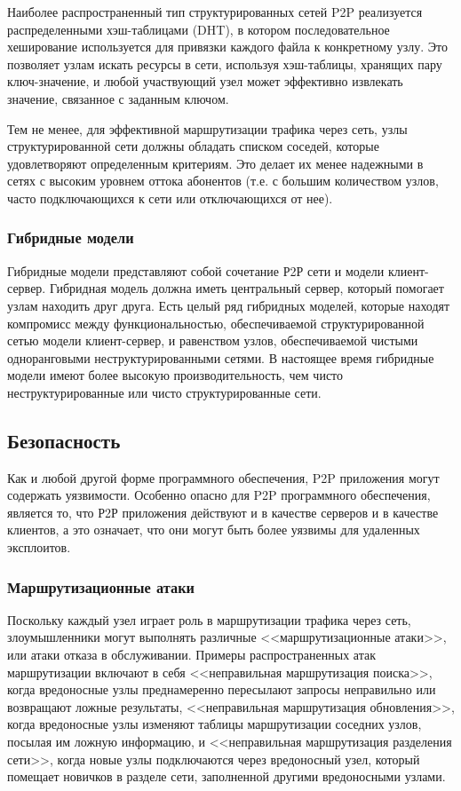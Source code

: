 \documentclass[bachelor, och, coursework]{SCWorks}
\begin{document}
Наиболее распространенный тип структурированных сетей P2P реализуется распределенными хэш-таблицами (DHT), 
в котором последовательное хеширование используется для привязки каждого файла к конкретному узлу. Это позволяет узлам искать ресурсы в сети, используя хэш-таблицы, хранящих пару ключ-значение, и любой участвующий узел может эффективно извлекать значение, связанное с заданным ключом.

Тем не менее, для эффективной маршрутизации трафика через сеть, узлы структурированной сети должны обладать списком соседей, 
которые удовлетворяют определенным критериям. 
Это делает их менее надежными в сетях с высоким уровнем оттока абонентов (т.е. с большим количеством узлов, 
часто подключающихся к сети или отключающихся от нее).

\subsubsection{Гибридные модели}
Гибридные модели представляют собой сочетание Р2Р сети и модели клиент-сервер. 
Гибридная модель должна иметь центральный сервер, который помогает узлам находить друг друга. 
Есть целый ряд гибридных моделей, которые находят компромисс между функциональностью, обеспечиваемой структурированной сетью модели клиент-сервер, 
и равенством узлов, обеспечиваемой чистыми одноранговыми неструктурированными сетями. 
В настоящее время гибридные модели имеют более высокую производительность, чем чисто неструктурированные или чисто структурированные сети.

\subsection{Безопасность}
Как и любой другой форме программного обеспечения, P2P приложения могут содержать уязвимости. 
Особенно опасно для P2P программного обеспечения, является то, что Р2Р приложения действуют и в качестве серверов и в качестве клиентов, 
а это означает, что они могут быть более уязвимы для удаленных эксплоитов.

\subsubsection{Маршрутизационные атаки}
Поскольку каждый узел играет роль в маршрутизации трафика через сеть, злоумышленники могут выполнять различные <<маршрутизационные атаки>>, или атаки отказа в обслуживании. Примеры распространенных атак маршрутизации включают в себя <<неправильная маршрутизация поиска>>, когда вредоносные узлы преднамеренно пересылают запросы неправильно или возвращают ложные результаты, <<неправильная маршрутизация обновления>>, когда вредоносные узлы изменяют таблицы маршрутизации соседних узлов, посылая им ложную информацию, и <<неправильная маршрутизация разделения сети>>, когда новые узлы подключаются через вредоносный узел, который помещает новичков в разделе сети, заполненной другими вредоносными узлами.
\end{document}
